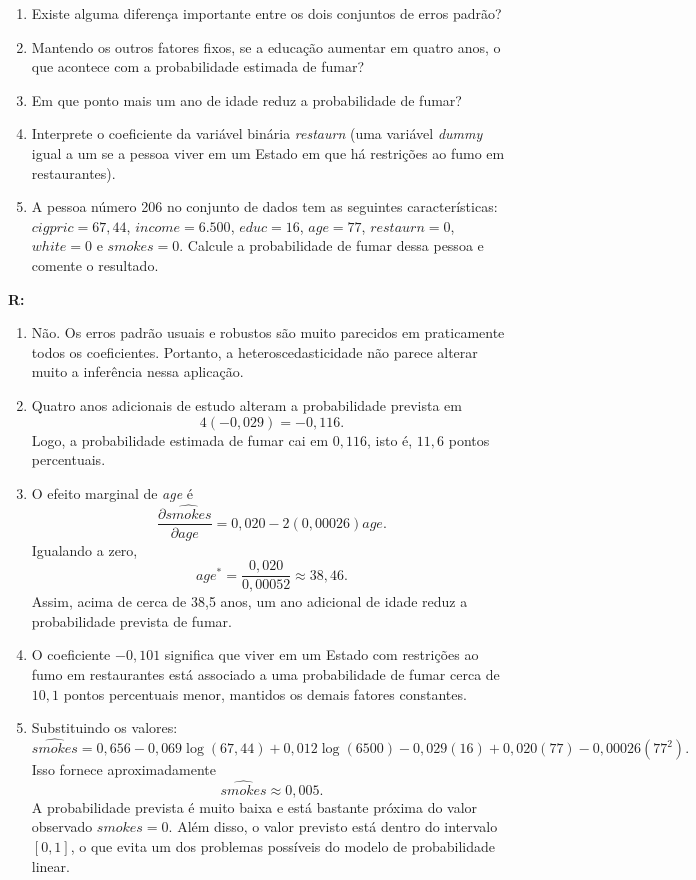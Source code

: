 \documentclass[12pt,letterpaper, onecolumn]{exam}
\renewenvironment{solution}
{\par\noindent\textbf{R:}\enspace\color{blue}}
{\par\color{black}}
\begin{document}
\begin{questions}
\begin{enumerate}[label=(\roman*)]
    \item Existe alguma diferença importante entre os dois conjuntos de erros padrão?
    \item Mantendo os outros fatores fixos, se a educação aumentar em quatro anos, o que acontece com a probabilidade estimada de fumar?
    \item Em que ponto mais um ano de idade reduz a probabilidade de fumar?
    \item Interprete o coeficiente da variável binária \textit{restaurn} (uma variável \textit{dummy} igual a um se a pessoa viver em um Estado em que há restrições ao fumo em restaurantes).
    \item A pessoa número 206 no conjunto de dados tem as seguintes características: \(cigpric = 67{,}44\), \(income = 6.500\), \(educ = 16\), \(age = 77\), \(restaurn = 0\), \(white = 0\) e \(smokes = 0\). Calcule a probabilidade de fumar dessa pessoa e comente o resultado.
\end{enumerate}

\begin{solution}
\begin{enumerate}[label=(\roman*)]
    \item Não. Os erros padrão usuais e robustos são muito parecidos em praticamente todos os coeficientes. Portanto, a heteroscedasticidade não parece alterar muito a inferência nessa aplicação.

    \item Quatro anos adicionais de estudo alteram a probabilidade prevista em
    \[
    4(-0,029) = -0,116.
    \]
    Logo, a probabilidade estimada de fumar cai em \(0,116\), isto é, \(11,6\) pontos percentuais.

    \item O efeito marginal de \textit{age} é
    \[
    \frac{\partial \widehat{smokes}}{\partial age}=0,020-2(0,00026)age.
    \]
    Igualando a zero,
    \[
    age^\ast=\frac{0,020}{0,00052}\approx 38,46.
    \]
    Assim, acima de cerca de 38,5 anos, um ano adicional de idade reduz a probabilidade prevista de fumar.

    \item O coeficiente \(-0,101\) significa que viver em um Estado com restrições ao fumo em restaurantes está associado a uma probabilidade de fumar cerca de \(10,1\) pontos percentuais menor, mantidos os demais fatores constantes.

    \item Substituindo os valores:
    \[
    \widehat{smokes}
    =
    0,656 - 0,069\log(67,44) + 0,012\log(6500) - 0,029(16) + 0,020(77) - 0,00026(77^2).
    \]
    Isso fornece aproximadamente
    \[
    \widehat{smokes}\approx 0,005.
    \]
    A probabilidade prevista é muito baixa e está bastante próxima do valor observado \(smokes=0\). Além disso, o valor previsto está dentro do intervalo \([0,1]\), o que evita um dos problemas possíveis do modelo de probabilidade linear.
\end{enumerate}
\end{solution}


\end{questions}
\end{document}
